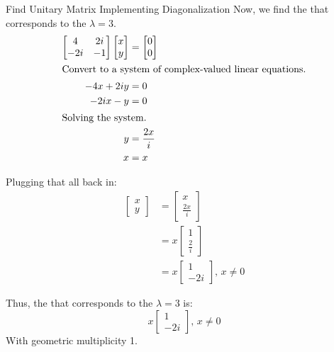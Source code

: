 \begin{example}{Find Unitary Matrix Implementing Diagonalization}
  Now, we find the  that corresponds to the  $\lambda = 3$.
  \begin{align*}
    \begin{bmatrix}
      4 & 2i \\
      -2i & -1
    \end{bmatrix}
            \begin{bmatrix}
              x \\ y
            \end{bmatrix} &=
                            \begin{bmatrix}
                              0 \\ 0
                            \end{bmatrix} \\
    \intertext{Convert to a system of complex-valued linear equations.}
    -4x + 2iy &= 0 \\
    -2ix - y &= 0 \\
    \intertext{Solving the system.}
    y &= \frac{2x}{i} \\
    x &= x
  \end{align*}

  Plugging that all back in:
  \begin{align*}
    \begin{bmatrix}
      x \\ y
    \end{bmatrix} &=
                    \begin{bmatrix}
                      x \\ \frac{2x}{i}
                    \end{bmatrix} \\
    &= x
      \begin{bmatrix}
        1 \\ \frac{2}{i}
      \end{bmatrix} \\
    &= x
      \begin{bmatrix}
        1 \\ -2i
      \end{bmatrix}, \, x \neq 0
  \end{align*}

  Thus, the  that corresponds to the  $\lambda = 3$ is:
  \begin{equation*}
    x
    \begin{bmatrix}
      1 \\ -2i
    \end{bmatrix}, \, x \neq 0
  \end{equation*}
  With geometric multiplicity 1.


\end{example}
